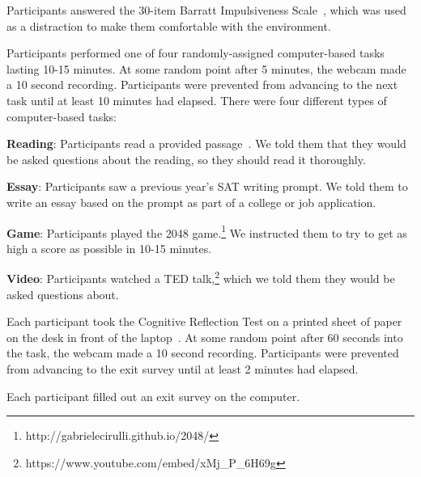 \documentclass{sigchi}
\newenvironment{packed_enum}{
\begin{enumerate}
  \setlength{\itemsep}{1pt}
  \setlength{\parskip}{0pt}
  \setlength{\parsep}{0pt}
}{\end{enumerate}}
\newenvironment{packed_item}{
\begin{itemize}
  \setlength{\itemsep}{1pt}
  \setlength{\parskip}{0pt}
  \setlength{\parsep}{0pt}
}{\end{itemize}}
\begin{document}
\begin{packed_enum}
\item Participants answered the 30-item Barratt Impulsiveness Scale~\cite{Patton1995}, which was used as a distraction to make them comfortable with the environment.
\item Participants performed one of four randomly-assigned computer-based tasks lasting 10-15 minutes. At some random point after 5 minutes, the webcam made a 10 second recording. Participants were prevented from advancing to the next task until at least 10 minutes had elapsed. There were four different types of computer-based tasks:
\begin{packed_item}
\item {\bf Reading}: Participants read a provided passage~\cite{Filkins2014}. We told them that they would be asked questions about the reading, so they should read it thoroughly.
\item {\bf Essay}: Participants saw a previous year's SAT writing prompt. We told them to write an essay based on the prompt as part of a college or job application.
\item {\bf Game}: Participants played the 2048 game.\footnote{http://gabrielecirulli.github.io/2048/} We instructed them to try to get as high a score as possible in 10-15 minutes.
\item {\bf Video}: Participants watched a TED talk,\footnote{https://www.youtube.com/embed/xMj\_P\_6H69g} which we told them they would be asked questions about.
\end{packed_item}
\item Each participant took the Cognitive Reflection Test on a printed sheet of paper on the desk in front of the laptop~\cite{Frederick2005}. At some random point after 60 seconds into the task, the webcam made a 10 second recording. Participants were prevented from advancing to the exit survey until at least 2 minutes had elapsed.
\item Each participant filled out an exit survey on the computer. 



\end{packed_enum}
\end{document}

